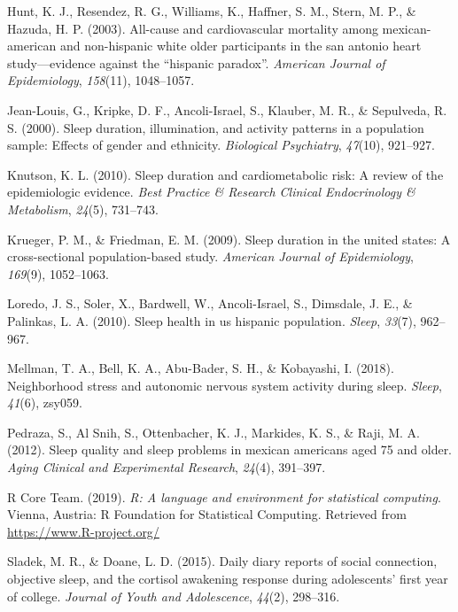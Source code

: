 \documentclass[man, fleqn, noextraspace]{apa6}
\begin{document}
\leavevmode\hypertarget{ref-hunt2003all}{}%
Hunt, K. J., Resendez, R. G., Williams, K., Haffner, S. M., Stern, M. P., \& Hazuda, H. P. (2003). All-cause and cardiovascular mortality among mexican-american and non-hispanic white older participants in the san antonio heart study---evidence against the ``hispanic paradox''. \emph{American Journal of Epidemiology}, \emph{158}(11), 1048--1057.

\leavevmode\hypertarget{ref-jean2000sleep}{}%
Jean-Louis, G., Kripke, D. F., Ancoli-Israel, S., Klauber, M. R., \& Sepulveda, R. S. (2000). Sleep duration, illumination, and activity patterns in a population sample: Effects of gender and ethnicity. \emph{Biological Psychiatry}, \emph{47}(10), 921--927.

\leavevmode\hypertarget{ref-knutson2010sleep}{}%
Knutson, K. L. (2010). Sleep duration and cardiometabolic risk: A review of the epidemiologic evidence. \emph{Best Practice \& Research Clinical Endocrinology \& Metabolism}, \emph{24}(5), 731--743.

\leavevmode\hypertarget{ref-krueger2009sleep}{}%
Krueger, P. M., \& Friedman, E. M. (2009). Sleep duration in the united states: A cross-sectional population-based study. \emph{American Journal of Epidemiology}, \emph{169}(9), 1052--1063.

\leavevmode\hypertarget{ref-loredo2010sleep}{}%
Loredo, J. S., Soler, X., Bardwell, W., Ancoli-Israel, S., Dimsdale, J. E., \& Palinkas, L. A. (2010). Sleep health in us hispanic population. \emph{Sleep}, \emph{33}(7), 962--967.

\leavevmode\hypertarget{ref-mellman_2018_SNS}{}%
Mellman, T. A., Bell, K. A., Abu-Bader, S. H., \& Kobayashi, I. (2018). Neighborhood stress and autonomic nervous system activity during sleep. \emph{Sleep}, \emph{41}(6), zsy059.

\leavevmode\hypertarget{ref-pedraza2012sleep}{}%
Pedraza, S., Al Snih, S., Ottenbacher, K. J., Markides, K. S., \& Raji, M. A. (2012). Sleep quality and sleep problems in mexican americans aged 75 and older. \emph{Aging Clinical and Experimental Research}, \emph{24}(4), 391--397.

\leavevmode\hypertarget{ref-R-base}{}%
R Core Team. (2019). \emph{R: A language and environment for statistical computing}. Vienna, Austria: R Foundation for Statistical Computing. Retrieved from \url{https://www.R-project.org/}

\leavevmode\hypertarget{ref-sladek2015daily}{}%
Sladek, M. R., \& Doane, L. D. (2015). Daily diary reports of social connection, objective sleep, and the cortisol awakening response during adolescents' first year of college. \emph{Journal of Youth and Adolescence}, \emph{44}(2), 298--316.
\end{document}
